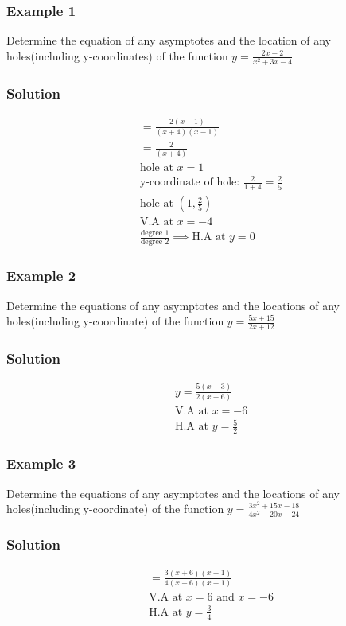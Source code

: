 \documentclass{article}
\begin{document}
\subsubsection{Example 1}
Determine the equation of any asymptotes and the location of any holes(including y-coordinates) of the function $y=\frac{2x-2}{x^2+3x-4}$
\subsubsection*{Solution}
\begin{align*}
    &=\frac{2(x-1)}{(x+4)(x-1)}\\
    &=\frac{2}{(x+4)}\\
    &\text{hole at } x=1\\
    &\text{y-coordinate of hole: } \frac{2}{1+4}=\frac{2}{5}\\
    &\text{hole at } \left(1, \frac{2}{5}\right)\\
    &\text{V.A at } x=-4\\
    &\frac{\text{degree 1}}{\text{degree 2}} \implies \text{H.A at } y=0
\end{align*}
\subsubsection{Example 2}
Determine the equations of any asymptotes and the locations of any holes(including y-coordinate) of the function $y=\frac{5x+15}{2x+12}$
\subsubsection*{Solution}
\begin{align*}
    &y=\frac{5(x+3)}{2(x+6)}\\
    & \text{V.A at } x=-6\\
    & \text{H.A at } y=\frac{5}{2}
\end{align*}
\subsubsection{Example 3}
Determine the equations of any asymptotes and the locations of any holes(including y-coordinate) of the function $y=\frac{3x^2+15x-18}{4x^2-20x-24}$
\subsubsection*{Solution}
\begin{align*}
    &=\frac{3(x+6)(x-1)}{4(x-6)(x+1)}\\
    &\text{V.A at } x=6 \text{ and } x=-6\\
    &\text{H.A at } y=\frac{3}{4}
\end{align*}
\end{document}

